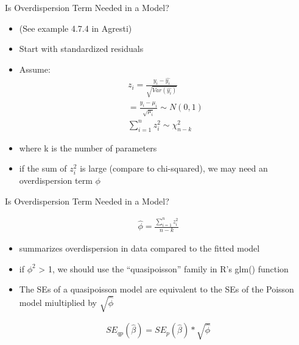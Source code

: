 \documentclass[ignorenonframetext,]{beamer}
\begin{document}
\begin{frame}{Is Overdispersion Term Needed in a Model?}

\begin{itemize}
\item
  (See example 4.7.4 in Agresti)
\item
  Start with standardized residuals
\item
  Assume:\\
  \[
  \begin{aligned}
  z_i = \frac{y_i - \hat{y_i}}{\sqrt{Var(\hat{y_i})}} \\
  = \frac{y_i - \mu_i}{\sqrt{\mu_i}} \sim N(0,1) \\
  \sum_{i =1}^n z_i^2 \sim \chi^2_{n-k}
  \end{aligned}
  \]
\item
  where k is the number of parameters\\
\item
  if the sum of \(z_i^2\) is large (compare to chi-squared), we may need
  an overdispersion term \(\phi\)
\end{itemize}

\end{frame}

\begin{frame}{Is Overdispersion Term Needed in a Model?}

\[
\begin{aligned}
\hat{\phi} = \frac{\sum_{i=1}^n z_i^2}{n-k}
\end{aligned}
\]

\begin{itemize}
\item
  summarizes overdispersion in data compared to the fitted model
\item
  if \(\phi^2\) \textgreater{} 1, we should use the ``quasipoisson''
  family in R's glm() function
\item
  The SEs of a quasipoisson model are equivalent to the SEs of the
  Poisson model miultiplied by \(\sqrt{\hat{\phi}}\)
\end{itemize}

\[
\begin{aligned}
SE_{qp}(\hat{\beta}) = SE_p(\hat{\beta})*\sqrt{\hat{\phi}}
\end{aligned}
\]

\end{frame}
\end{document}
